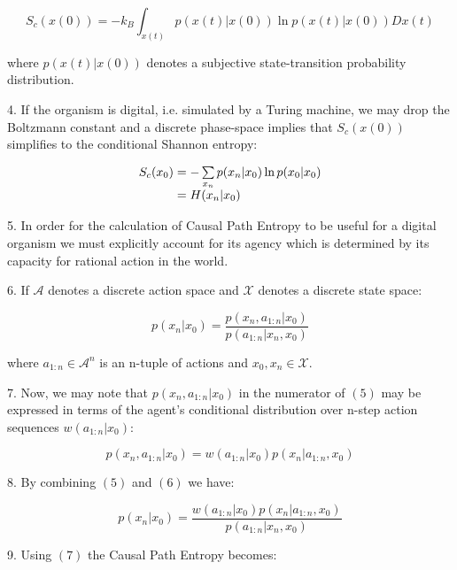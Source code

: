 \documentclass{article}
\begin{document}
\begin{equation}
S_c(x(0))=-k_B \int_{x(t)} p(x(t)|x(0))\ln p(x(t)|x(0)) Dx(t)
\end{equation}

where $p(x(t)|x(0))$ denotes a subjective state-transition probability distribution.

\newpage

4. If the organism is digital, i.e. simulated by a Turing machine, we may drop the Boltzmann constant and a discrete phase-space implies that $S_c(x(0))$ simplifies to the conditional Shannon entropy:


\begin{equation}
\begin{array}{l@{}l}
S_c(x_0) 
    &{}= - \sum\limits_{x_n} p(x_n|x_0)\ln p(x_0|x_0) \\
    &{}= H(x_n|x_0) \\
\end{array}
\end{equation}

5. In order for the calculation of Causal Path Entropy to be useful for a digital organism we must explicitly account for its agency which is determined by its capacity for rational action in the world. 

6. If $\mathcal{A}$ denotes a discrete action space and $\mathcal{X}$ denotes a discrete state space:

\begin{equation}
p(x_n|x_0)= \frac{p(x_n,a_{1:n}|x_0)}{p(a_{1:n}|x_n,x_0)}
\end{equation}

where $a_{1:n} \in \mathcal{A}^n$ is an n-tuple of actions and $x_0,x_n \in \mathcal{X}$.

7. Now, we may note that $p(x_n,a_{1:n}|x_0)$ in the numerator of $(5)$ may be expressed in terms of the agent's conditional distribution over n-step action sequences $w(a_{1:n}|x_0)$:

\begin{equation}
p(x_n,a_{1:n}|x_0)= w(a_{1:n}|x_0)p(x_n|a_{1:n},x_0)
\end{equation}

8. By combining $(5)$ and $(6)$ we have:

\begin{equation}
p(x_n|x_0)= \frac{w(a_{1:n}|x_0)p(x_n|a_{1:n},x_0)}{p(a_{1:n}|x_n,x_0)}
\end{equation}

9. Using $(7)$ the Causal Path Entropy becomes:
\end{document}
